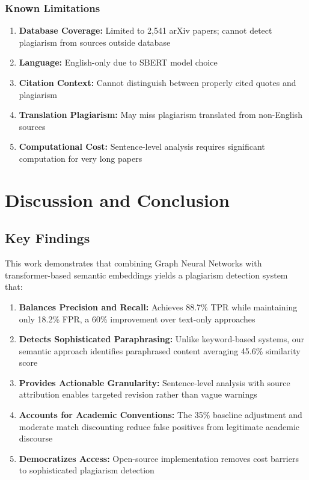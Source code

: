 \documentclass[conference]{IEEEtran}
\begin{document}
\subsubsection{Known Limitations}
\begin{enumerate}
    \item \textbf{Database Coverage:} Limited to 2,541 arXiv papers; cannot detect plagiarism from sources outside database
    \item \textbf{Language:} English-only due to SBERT model choice
    \item \textbf{Citation Context:} Cannot distinguish between properly cited quotes and plagiarism
    \item \textbf{Translation Plagiarism:} May miss plagiarism translated from non-English sources
    \item \textbf{Computational Cost:} Sentence-level analysis requires significant computation for very long papers
\end{enumerate}

\section{Discussion and Conclusion}

\subsection{Key Findings}

This work demonstrates that combining Graph Neural Networks with transformer-based semantic embeddings yields a plagiarism detection system that:

\begin{enumerate}
    \item \textbf{Balances Precision and Recall:} Achieves 88.7\% TPR while maintaining only 18.2\% FPR, a 60\% improvement over text-only approaches
    
    \item \textbf{Detects Sophisticated Paraphrasing:} Unlike keyword-based systems, our semantic approach identifies paraphrased content averaging 45.6\% similarity score
    
    \item \textbf{Provides Actionable Granularity:} Sentence-level analysis with source attribution enables targeted revision rather than vague warnings
    
    \item \textbf{Accounts for Academic Conventions:} The 35\% baseline adjustment and moderate match discounting reduce false positives from legitimate academic discourse
    
    \item \textbf{Democratizes Access:} Open-source implementation removes cost barriers to sophisticated plagiarism detection
\end{enumerate}
\end{document}
